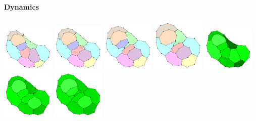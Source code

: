 \documentclass[t,18pt]{beamer}
\begin{document}
\begin{frame}[c]
  \frametitle{}
  \framesubtitle{Dynamics}
  \includegraphics[width=2.5cm]{../Thesis/Resources/Evaluation-Example-Dynamics-AE097F3A-14FD-4735-A19B-8FD343CA3346-0.pdf}
  \includegraphics[width=2.5cm]{../Thesis/Resources/Evaluation-Example-Dynamics-AE097F3A-14FD-4735-A19B-8FD343CA3346-1.pdf}
  \includegraphics[width=2.5cm]{../Thesis/Resources/Evaluation-Example-Dynamics-AE097F3A-14FD-4735-A19B-8FD343CA3346-2.pdf}
  \includegraphics[width=2.5cm]{../Thesis/Resources/Evaluation-Example-Dynamics-AE097F3A-14FD-4735-A19B-8FD343CA3346-3.pdf}
  \includegraphics[width=2.5cm]{../Thesis/Resources/Evaluation-Example-Dynamics-AE097F3A-14FD-4735-A19B-8FD343CA3346-0-P.pdf}
  \includegraphics[width=2.5cm]{../Thesis/Resources/Evaluation-Example-Dynamics-AE097F3A-14FD-4735-A19B-8FD343CA3346-1-P.pdf}
  \includegraphics[width=2.5cm]{../Thesis/Resources/Evaluation-Example-Dynamics-AE097F3A-14FD-4735-A19B-8FD343CA3346-2-P.pdf}

\end{frame}
\end{document}
